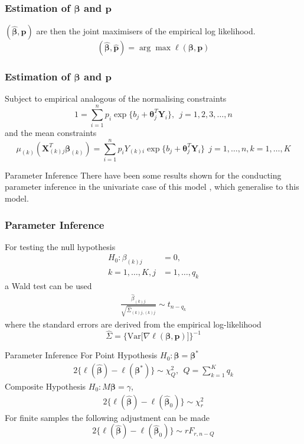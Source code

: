 \documentclass[9pt,notes=hide]{beamer}
\newcommand{\vect}[1]{\boldsymbol #1}
\newcommand{\Var}{\mbox{Var}}
\newcommand{\vbe}{\vect{\beta}}
\newcommand{\X}{\vect{X}}
\newcommand{\Y}{\vect{Y}}
\begin{document}
\begin{frame}
	\frametitle{Estimation of $\vbe$ and $\vect{p}$}
	$(\hat{\vbe}, \hat{\vect{p}}) $ are then the joint maximisers of the empirical log likelihood.
	\begin{equation*}
		(\hat{\vbe}, \hat{\vect{p}}) = \arg\max  \ell(\vbe, \vect{p})
	\end{equation*}
\end{frame}


\begin{frame}
	\frametitle{Estimation of $\vbe$ and $\vect{p}$}
	Subject to  empirical analogous of the normalising constraints
	\begin{equation*}\label{eq:chap2:empiricalNormalisationConstraint}
		1 = \sum_{i = 1}^{n} p_i \exp \{b_j + \vect{\theta}_j^T\Y_i \}, \  \ j = 1, 2, 3,  \dots, n
	\end{equation*}
	\pause
	and the mean constraints
	\begin{equation*}\label{eq:chap2:empiricalMeanConstraint}
		\mu_{(k)}(\X_{(k)j}^T\vbe_{(k)}) = \sum_{i = 1}^{n} p_iY_{(k)i} \exp \{b_j + \vect{\theta}_j^T\Y_i \}\  \ j = 1,  \dots, n, k = 1,\dots, K
	\end{equation*}
\end{frame}


\begin{frame}{Parameter Inference}
	There have been some results shown for the conducting parameter inference in
	the univariate case of this model \parencite{Huang2014,HuangRathouz2017},
	which generalise to this model.
\end{frame}


\begin{frame}
	\frametitle{Parameter Inference}
	For testing the null hypothesis
	\begin{align*}
		H_0:\beta_{(k)j}  & = 0,            \\
		k = 1,\dots, K, j & = 1, \dots, q_k
	\end{align*}
	\pause
	a Wald test can be used
	\begin{align*}
		\frac{\hat{\beta}_{(k)j}}{\sqrt{\hat{\Sigma}_{(k)j,(k)j}}} \sim t_{n - q_k}
	\end{align*}
	\pause
	where the standard errors are derived from the empirical log-likelihood
	\[
		\hat{\Sigma} = \Bigg\{\Var\Big[\nabla \ell (\vbe, \vect{p})\Big] \Bigg\}^{-1}
	\]
\end{frame}

\begin{frame}{Parameter Inference}
	For Point Hypothesis $H_0:\vbe = \vbe^*$
	\begin{align*}
		2\{\ell(\hat{\vbe}) - \ell(\vbe^{*}) \} \sim \chi^2_{Q},  \  \ Q = \sum_{k = 1}^{K}q_k
	\end{align*}
	\pause
	Composite Hypothesis $H_0:M\vbe = \gamma$,
	\begin{align*}
		2\{\ell(\hat{\vbe}) - \ell(\hat{\vbe}_0) \} \sim \chi^2_{r}
	\end{align*}
	\pause
	For finite samples  the following adjustment can be made
	\[
		2\{\ell(\hat{\vbe}) - \ell(\hat{\vbe}_0) \} \sim rF_{r, n - Q}
	\]
\end{frame}
\end{document}
